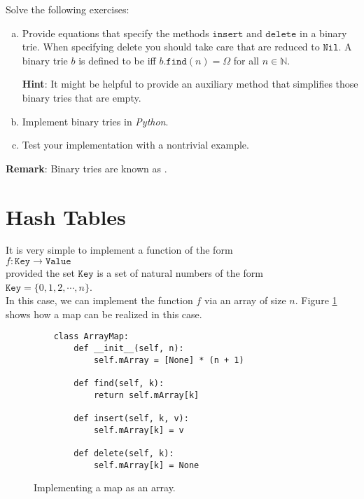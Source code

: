 Solve the following exercises:
\begin{enumerate}[(a)]
\item Provide equations that specify the methods $\texttt{insert}$ and $\texttt{delete}$ in a binary trie.
      When specifying delete you should take care that  are reduced to
      $\texttt{Nil}$.  A binary trie $b$ is defined to be  iff $b.\mathtt{find}(n) = \Omega$ for all $n \in \mathbb{N}$.

      \textbf{Hint}:  It might be helpful to provide an auxiliary method that simplifies those binary tries
      that are empty. 
\item Implement binary tries in \textsl{Python}.
\item Test your implementation with a nontrivial example.
\end{enumerate}
\textbf{Remark}: Binary tries are known as .  \eox

\section{Hash Tables}
It is very simple to implement a function of the form \\[0.2cm]
\hspace*{1.3cm} $f: \texttt{Key} \rightarrow \texttt{Value}$ \\[0.2cm]
provided the set $\texttt{Key}$ is a set of natural numbers of the form  \\[0.2cm]
\hspace*{1.3cm} $\texttt{Key} = \{ 0, 1, 2, \cdots, n \}$. \\[0.2cm]
In this case, we can implement the function $f$ via an array of size $n$.
Figure \ref{fig:map-array.ipython} shows how a map can be realized in this case.

\begin{figure}[!ht]
\centering
\begin{verbatim}
    class ArrayMap:
        def __init__(self, n):
            self.mArray = [None] * (n + 1)
            
        def find(self, k):
            return self.mArray[k]
        
        def insert(self, k, v):
            self.mArray[k] = v
    
        def delete(self, k):
            self.mArray[k] = None
\end{verbatim}
\vspace*{-0.3cm}
\caption{Implementing a map as an array.}
\label{fig:map-array.ipython}
\end{figure}

